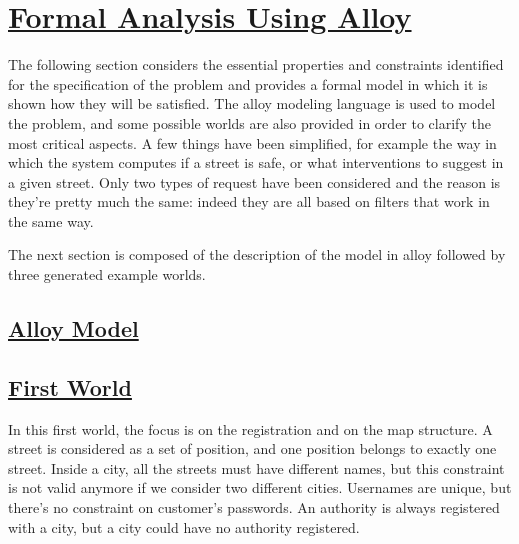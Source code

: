 \section[Formal Analysis Using Alloy]{\hyperlink{toc}{Formal Analysis Using Alloy}}
	\label{sec:formalAnalysisUsingAlloy}
	The following section considers the essential properties and constraints identified for the specification of the problem and provides a formal model in which it is shown how they will be satisfied. The alloy modeling language is used to model the problem, and some possible worlds are also provided in order to clarify the most critical aspects. 
	A few things have been simplified, for example the way in which the system computes if a street is safe, or what interventions to suggest in a given street. Only two types of request have been considered and the reason is they're pretty much the same: indeed they are all based on filters that work in the same way.
	
	The next section is composed of the description of the model in alloy followed by three generated example worlds.
	
	\subsection[Alloy Model]{\hyperlink{toc}{Alloy Model}}
	
	
	\subsection[First World]{\hyperlink{toc}{First World}}
	In this first world, the focus is on the registration and on the map structure. 
	A street is considered as a set of position, and one position belongs to exactly one street. Inside a city, all the streets must have different names, but this constraint is not valid anymore if we consider two different cities.
	Usernames are unique, but there's no constraint on customer's passwords.
	An authority is always registered with a city, but a city could have no authority registered.
	
